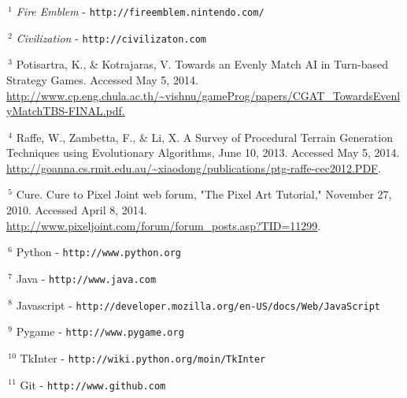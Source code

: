 \documentclass{article}
\begin{document}
\noindent
$\,^1$
\emph{Fire Emblem} - {\tt http://fireemblem.nintendo.com/}

\vspace{.3em}

\noindent
$\,^2$
\emph{Civilization} - {\tt http://civilizaton.com}

\vspace{.3em}

\noindent
\hangindent=1cm
$\,^3$
Potisartra, K., \& Kotrajaras, V. Towards an Evenly Match AI in Turn-based Strategy Games. Accessed May 5, 2014. \url{http://www.cp.eng.chula.ac.th/~vishnu/gameProg/papers/CGAT_TowardsEvenlyMatchTBS-FINAL.pdf.}

\vspace{.3em}

\noindent
\hangindent=1cm
$\,^4$
Raffe, W., Zambetta, F., \& Li, X. A Survey of Procedural Terrain Generation Techniques using Evolutionary Algorithms, June 10, 2013. Accessed May 5, 2014. \url{http://goanna.cs.rmit.edu.au/~xiaodong/publications/ptg-raffe-cec2012.PDF}.

\vspace{.3em}

\noindent
\hangindent=1cm
$\,^5$
Cure. Cure to Pixel Joint web forum, "The Pixel Art Tutorial," November 27, 2010. Accessed April 8, 2014. \url{http://www.pixeljoint.com/forum/forum_posts.asp?TID=11299}. 

\vspace{.3em}

\noindent
$\,^6$
Python - {\tt http://www.python.org}

\vspace{.3em}

\noindent
$\,^7$
Java - {\tt http://www.java.com}

\vspace{.3em}

\noindent
$\,^8$
Javascript - {\tt http://developer.mozilla.org/en-US/docs/Web/JavaScript}

\vspace{.3em}

\noindent
$\,^9$
Pygame - {\tt http://www.pygame.org}

\vspace{.3em}

\noindent
$\,^{10}$
TkInter - {\tt http://wiki.python.org/moin/TkInter}

\vspace{.3em}

\noindent
$\,^{11}$
Git - {\tt http://www.github.com}
\end{document}
